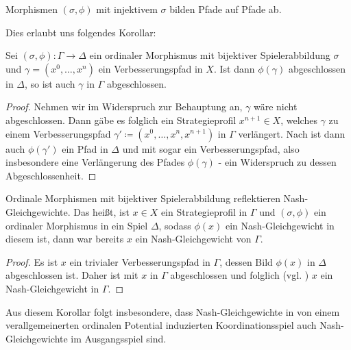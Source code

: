 \begin{beob}\label{beob:PfadeAufPfade}
	Morphismen $(\sigma, \phi)$ mit injektivem $\sigma$ bilden Pfade auf Pfade ab.
\end{beob}

Dies erlaubt uns folgendes Korollar:

\begin{kor}\label{kor:ReflAbg}
	Sei $(\sigma, \phi): \Gamma \to \Delta$ ein ordinaler Morphismus mit bijektiver Spielerabbildung $\sigma$ und $\gamma = (x^0, \dots, x^n)$ ein Verbesserungspfad in $X$. Ist dann $\phi(\gamma)$ abgeschlossen in $\Delta$, so ist auch $\gamma$ in $\Gamma$ abgeschlossen.
\end{kor}
	
\begin{proof}	
	Nehmen wir im Widerspruch zur Behauptung an, $\gamma$ wäre nicht abgeschlossen. Dann gäbe es folglich ein Strategieprofil $x^{n+1} \in X$, welches $\gamma$ zu einem Verbesserungspfad $\gamma' \coloneqq (x^0, \dots, x^n, x^{n+1})$ in $\Gamma$ verlängert. Nach  ist dann auch $\phi(\gamma')$ ein Pfad in $\Delta$ und mit  sogar ein Verbesserungspfad, also insbesondere eine Verlängerung des Pfades $\phi(\gamma)$ - ein Widerspruch zu dessen Abgeschlossenheit.
\end{proof}

\begin{kor}\label{kor:ReflektNG}
	Ordinale Morphismen mit bijektiver Spielerabbildung reflektieren Nash-Gleichgewichte. Das heißt, ist $x \in X$ ein Strategieprofil in $\Gamma$ und $(\sigma, \phi)$ ein ordinaler Morphismus in ein Spiel $\Delta$, sodass $\phi(x)$ ein Nash-Gleichgewicht in diesem ist, dann war bereits $x$ ein Nash-Gleichgewicht von $\Gamma$.
\end{kor}

\begin{proof}
	Es ist $x$ ein trivialer Verbesserungspfad in $\Gamma$, dessen Bild $\phi(x)$ in $\Delta$ abgeschlossen ist. Daher ist mit  $x$ in $\Gamma$ abgeschlossen und folglich (vgl. ) $x$ ein Nash-Gleichgewicht in $\Gamma$.
\end{proof}

Aus diesem Korollar folgt insbesondere, dass Nash-Gleichgewichte in von einem verallgemeinerten ordinalen Potential induzierten Koordinationsspiel auch Nash-Gleichgewichte im Ausgangsspiel sind.

